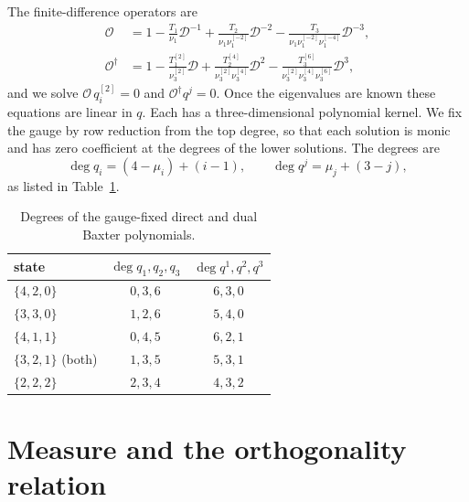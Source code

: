 \documentclass[11pt]{article}
\newcommand{\Op}{\mathcal{O}}
\newcommand{\sh}[1]{^{[#1]}}
\begin{document}
The finite-difference operators are
\begin{align}
\Op&=1-\frac{T_{1}}{\nu_1}\mathcal D^{-1}+\frac{T_{2}}{\nu_1\nu_1\sh{-2}}\mathcal D^{-2}
-\frac{T_{3}}{\nu_1\nu_1\sh{-2}\nu_1\sh{-4}}\mathcal D^{-3},\\
\Op^\dagger&=1-\frac{T_{1}\sh{2}}{\nu_3\sh{2}}\mathcal D+\frac{T_{2}\sh{4}}{\nu_3\sh{2}\nu_3\sh{4}}\mathcal D^{2}
-\frac{T_{3}\sh{6}}{\nu_3\sh{2}\nu_3\sh{4}\nu_3\sh{6}}\mathcal D^{3},
\end{align}
and we solve $\Op\,q_i\sh{2}=0$ and $\Op^\dagger q^j=0$. Once the eigenvalues are known these
equations are linear in $q$. Each has a three-dimensional polynomial kernel. We fix the gauge by
row reduction from the top degree, so that each solution is monic and has zero coefficient at the
degrees of the lower solutions. The degrees are
\begin{equation}
\deg q_i=(4-\mu_i)+(i-1),\qquad \deg q^j=\mu_j+(3-j),
\end{equation}
as listed in Table~\ref{tab:deg}.
\begin{table}[h]
\centering
\begin{tabular}{lcc}
\toprule
state & $\deg q_1,q_2,q_3$ & $\deg q^1,q^2,q^3$\\
\midrule
$\{4,2,0\}$ & $0,3,6$ & $6,3,0$\\
$\{3,3,0\}$ & $1,2,6$ & $5,4,0$\\
$\{4,1,1\}$ & $0,4,5$ & $6,2,1$\\
$\{3,2,1\}$ (both) & $1,3,5$ & $5,3,1$\\
$\{2,2,2\}$ & $2,3,4$ & $4,3,2$\\
\bottomrule
\end{tabular}
\caption{Degrees of the gauge-fixed direct and dual Baxter polynomials.}
\label{tab:deg}
\end{table}

\section{Measure and the orthogonality relation}
\end{document}

